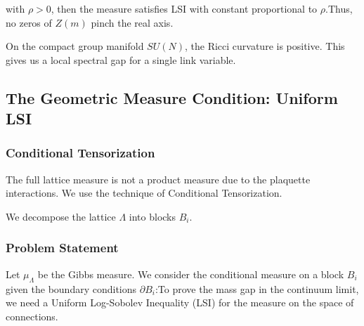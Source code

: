 with $\rho > 0$, then the measure satisfies LSI with constant proportional to $\rho$.Thus, no zeros of $Z(m)$ pinch the real axis.

On the compact group manifold $SU(N)$, the Ricci curvature is positive. This gives us a local spectral gap for a single link variable.

\subsection{The Geometric Measure Condition: Uniform LSI}

\subsubsection{Conditional Tensorization}\label{subsec:geometric_measure}

The full lattice measure is not a product measure due to the plaquette interactions. We use the technique of Conditional Tensorization.

We decompose the lattice $\Lambda$ into blocks $B_i$.\subsubsection{Problem Statement}

Let $\mu_\Lambda$ be the Gibbs measure. We consider the conditional measure on a block $B_i$ given the boundary conditions $\partial B_i$:To prove the mass gap in the continuum limit, we need a Uniform Log-Sobolev Inequality (LSI) for the measure on the space of connections.

